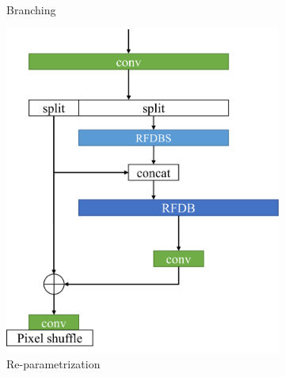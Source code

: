 \documentclass[10pt,twocolumn,letterpaper]{article}
\begin{document}
\begin{figure}
\begin{subfigure}[b]{0.49\linewidth}
        \caption{Branching}
        \label{fig:Branching}
    \end{subfigure}
    \begin{subfigure}[b]{0.49\linewidth}
		\centering
        \includegraphics[width=\textwidth]{../Re-parametrization.pdf}
        \caption{Re-parametrization}
        \label{fig:Re-parametrization}
    \end{subfigure}
    \begin{subfigure}[b]{0.49\linewidth}
		\centering

\end{subfigure}
\end{figure}
\end{document}

